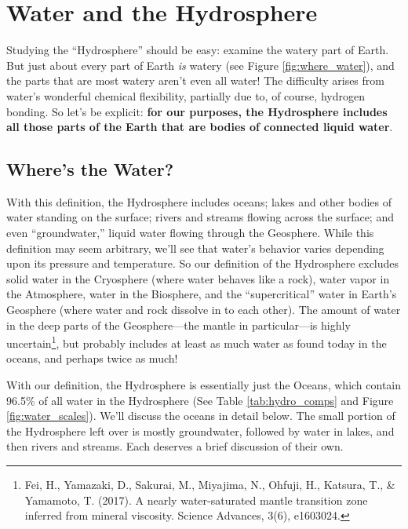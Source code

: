 \section{Water and the Hydrosphere} \label{Water and the Hydrosphere}
Studying the ``Hydrosphere'' should be easy: examine the watery part of Earth. But just about every part of Earth \emph{is} watery (see Figure \ref{fig:where_water}), and the parts that are most watery aren't even all water! The difficulty arises from water's wonderful chemical flexibility, partially due to, of course, hydrogen bonding. So let's be explicit: \textbf{for our purposes, the Hydrosphere includes all those parts of the Earth that are bodies of connected liquid water}. 
\subsection{Where's the Water?}
With this definition, the Hydrosphere includes oceans; lakes and other bodies of water standing on the surface; rivers and streams flowing across the surface; and even ``groundwater,'' liquid water flowing through the Geosphere. While this definition may seem arbitrary, we'll see that water's behavior varies depending upon its pressure and temperature. So our definition of the Hydrosphere excludes solid water in the Cryosphere (where water behaves like a rock), water vapor in the Atmosphere, water in the Biosphere, and the ``supercritical'' water in Earth's Geosphere (where water and rock dissolve in to each other). The amount of water in the deep parts of the Geosphere---the mantle in particular---is highly uncertain\footnote{Fei, H., Yamazaki, D., Sakurai, M., Miyajima, N., Ohfuji, H., Katsura, T., \& Yamamoto, T. (2017). A nearly water-saturated mantle transition zone inferred from mineral viscosity. Science Advances, 3(6), e1603024.}, but probably includes at least as much water as found today in the oceans, and perhaps twice as much! 
    
With our definition, the Hydrosphere is essentially just the Oceans, which contain 96.5\% of all water in the Hydrosphere (See Table \ref{tab:hydro_comps} and Figure \ref{fig:water_scales}). We'll discuss the oceans in detail below. The small portion of the Hydrosphere left over is mostly groundwater, followed by water in lakes, and then rivers and streams. Each deserves a brief discussion of their own.

